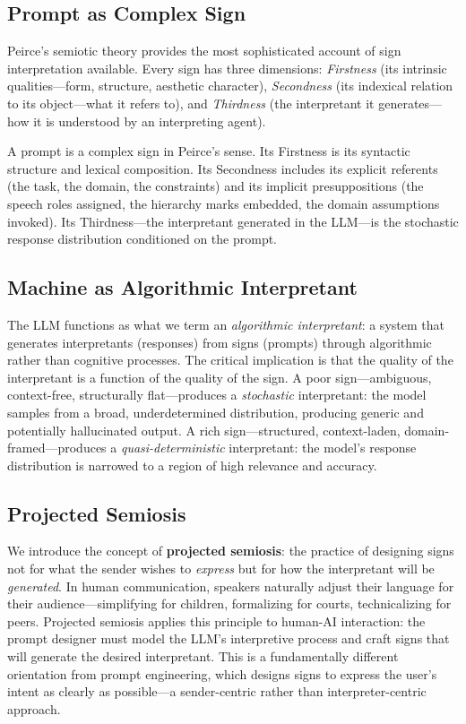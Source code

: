 \documentclass[12pt,a4paper]{article}
\begin{document}
\subsection{Prompt as Complex Sign}

Peirce's semiotic theory \cite{peirce1931} provides the most sophisticated account of sign interpretation available. Every sign has three dimensions: \emph{Firstness} (its intrinsic qualities---form, structure, aesthetic character), \emph{Secondness} (its indexical relation to its object---what it refers to), and \emph{Thirdness} (the interpretant it generates---how it is understood by an interpreting agent).

A prompt is a complex sign in Peirce's sense. Its Firstness is its syntactic structure and lexical composition. Its Secondness includes its explicit referents (the task, the domain, the constraints) and its implicit presuppositions (the speech roles assigned, the hierarchy marks embedded, the domain assumptions invoked). Its Thirdness---the interpretant generated in the LLM---is the stochastic response distribution conditioned on the prompt.

\subsection{Machine as Algorithmic Interpretant}

The LLM functions as what we term an \emph{algorithmic interpretant}: a system that generates interpretants (responses) from signs (prompts) through algorithmic rather than cognitive processes. The critical implication is that the quality of the interpretant is a function of the quality of the sign. A poor sign---ambiguous, context-free, structurally flat---produces a \emph{stochastic} interpretant: the model samples from a broad, underdetermined distribution, producing generic and potentially hallucinated output. A rich sign---structured, context-laden, domain-framed---produces a \emph{quasi-deterministic} interpretant: the model's response distribution is narrowed to a region of high relevance and accuracy.

\subsection{Projected Semiosis}

We introduce the concept of \textbf{projected semiosis}: the practice of designing signs not for what the sender wishes to \emph{express} but for how the interpretant will be \emph{generated}. In human communication, speakers naturally adjust their language for their audience---simplifying for children, formalizing for courts, technicalizing for peers. Projected semiosis applies this principle to human-AI interaction: the prompt designer must model the LLM's interpretive process and craft signs that will generate the desired interpretant. This is a fundamentally different orientation from prompt engineering, which designs signs to express the user's intent as clearly as possible---a sender-centric rather than interpreter-centric approach.
\end{document}
